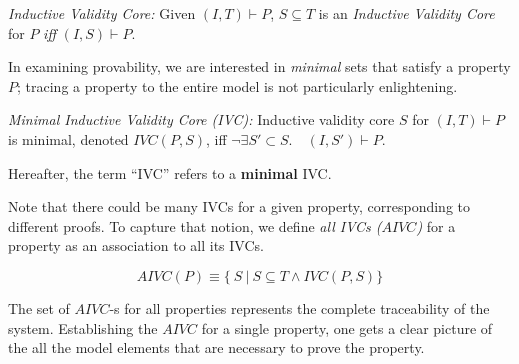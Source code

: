 \begin{definition}{\emph{Inductive Validity Core:}}
  \label{def:ivc}
  Given $(I, T)\vdash P$, $S \subseteq
  T$ is an {\em Inductive Validity Core} for $P$
  \emph{iff} $(I, S) \vdash P$.
\end{definition}

In examining provability, we are interested in {\em minimal} sets that satisfy a property $P$; tracing a property to the entire model is not particularly enlightening.

\begin{definition}{\emph{Minimal Inductive Validity Core (IVC):}}
  \label{def:minimal-ivc}
  Inductive validity core $S$ for $(I, T)\vdash P$ is minimal, denoted $IVC(P, S)$, iff
  $\neg\exists S' \subset S .\quad (I, S') \vdash P $.
\end{definition}

\begin{note}{}
Hereafter, the term ``IVC'' refers to a \textbf{minimal} IVC.
\end{note}

Note that there could be many IVCs for a given property, corresponding to different proofs. To capture that notion, we define \emph{all IVCs ($AIVC$)} for a property as an association to all its IVCs.

$$ AIVC(P) \equiv  \{\ S~|~S \subseteq T \land  IVC(P, S)\} $$

\noindent The set of $AIVC$-s for all properties represents the complete traceability of the system. Establishing the $AIVC$ for a single property, one gets a clear picture of the all the model elements that are necessary to prove the property.

